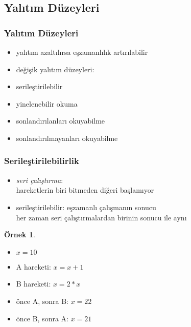 \documentclass[dvipsnames]{beamer}
\theoremstyle{definition}
\theoremstyle{example}
\newtheorem{ornek}[theorem]{Örnek}
\theoremstyle{plain}
\begin{document}
\subsection{Yalıtım Düzeyleri}

\begin{frame}
  \frametitle{Yalıtım Düzeyleri}

  \begin{itemize}
    \item yalıtım azaltılırsa eşzamanlılık artırılabilir
    \item değişik yalıtım düzeyleri:

    \bigskip
    \item serileştirilebilir
    \item yinelenebilir okuma
    \item sonlandırılanları okuyabilme
    \item sonlandırılmayanları okuyabilme
  \end{itemize}
\end{frame}

\begin{frame}
  \frametitle{Serileştirilebilirlik}

  \begin{itemize}
    \item \emph{seri çalıştırma}:\\
      hareketlerin biri bitmeden diğeri başlamıyor

    \pause
    \item \alert{serileştirilebilir}: eşzamanlı çalışmanın sonucu\\
      her zaman seri çalıştırmalardan birinin sonucu ile aynı
  \end{itemize}

  \pause
  \begin{ornek}
    \begin{itemize}
      \item $x = 10$
      \item A hareketi: $x = x + 1$
      \item B hareketi: $x = 2 * x$

      \pause
      \medskip
      \item önce A, sonra B: $x = 22$
      \item önce B, sonra A: $x = 21$
    \end{itemize}
  \end{ornek}
\end{frame}
\end{document}
